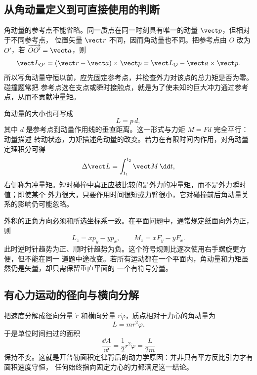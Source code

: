 \subsection*{从角动量定义到可直接使用的判断}

角动量的参考点不能省略。同一质点在同一时刻具有唯一的动量 $\vect p$，但相对于不同参考点，
位置矢量 $\vect r$ 不同，因而角动量也不同。把参考点由 $O$ 改为 $O'$，若
$\overrightarrow{OO'}=\vect a$，则
\begin{equation}
 \vect L_{O'}=(\vect r-\vect a)\times\vect p
 =\vect L_O-\vect a\times\vect p.
\end{equation}
所以写角动量守恒以前，应先固定参考点，并检查外力对该点的总力矩是否为零。碰撞题常把
参考点选在支点或瞬时接触点，就是为了使未知的巨大冲力通过参考点，从而不贡献冲量矩。

角动量的大小也可写成
\begin{equation}
 L=p\,d,
\end{equation}
其中 $d$ 是参考点到动量作用线的垂直距离。这一形式与力矩 $M=Fd$ 完全平行：动量描述
转动状态，力矩描述角动量的改变。若力在有限时间内作用，对角动量定理积分可得
\begin{equation}
 \Delta\vect L=\int_{t_1}^{t_2}\vect M\,\dd t,
\end{equation}
右侧称为冲量矩。短时碰撞中真正应被比较的是外力的冲量矩，而不是外力瞬时值；即使某个
外力很大，只要作用时间很短或力臂很小，它对碰撞前后角动量关系的影响仍可能忽略。

外积的正负方向必须和所选坐标系一致。在平面问题中，通常规定纸面向外为正，则
\begin{equation}
 L_z=xp_y-yp_x,
 \qquad
 M_z=xF_y-yF_x.
\end{equation}
此时逆时针趋势为正、顺时针趋势为负。这个符号规则比逐次使用右手螺旋更方便，但不能在同一
道题中途改变。若所有运动都在一个平面内，角动量和力矩虽然仍是矢量，却只需保留垂直平面的
一个有符号分量。

\subsection*{有心力运动的径向与横向分解}

把速度分解成径向分量 $\dot r$ 和横向分量 $r\dot\varphi$，质点相对于力心的角动量为
\begin{equation}
 L=mr^2\dot\varphi.
\end{equation}
于是单位时间扫过的面积
\begin{equation}
 \frac{\dd A}{\dd t}=\frac12r^2\dot\varphi=\frac{L}{2m}
\end{equation}
保持不变。这就是开普勒面积定律背后的动力学原因：并非只有平方反比引力才有面积速度守恒，
任何始终指向固定力心的力都满足这一结论。

